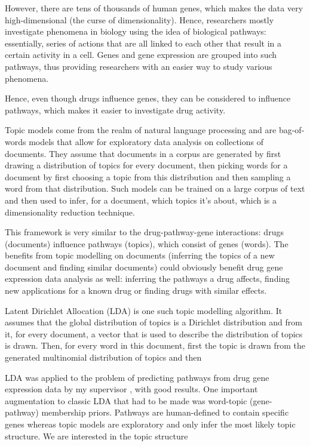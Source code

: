 \documentclass[12pt,a4paper,twoside,openright]{report}
\begin{document}
However, there are tens of thousands of human genes, which makes the data very high-dimensional (the curse of dimensionality). Hence, researchers mostly investigate phenomena in biology using the idea of biological pathways: essentially, series of actions that are all linked to each other that result in a certain activity in a cell. Genes and gene expression are grouped into such pathways, thus providing researchers with an easier way to study various phenomena.

Hence, even though drugs influence genes, they can be considered to influence pathways, which makes it easier to investigate drug activity.

Topic models come from the realm of natural language processing and are bag-of-words models that allow for exploratory data analysis on collections of documents. They assume that documents in a corpus are generated by first drawing a distribution of topics for every document, then picking words for a document by first choosing a topic from this distribution and then sampling a word from that distribution. Such models can be trained on a large corpus of text and then used to infer, for a document, which topics it's about, which is a dimensionality reduction technique.

This framework is very similar to the drug-pathway-gene interactions: drugs (documents) influence pathways (topics), which consist of genes (words). The benefits from topic modelling on documents (inferring the topics of a new document and finding similar documents) could obviously benefit drug gene expression data analysis as well: inferring the pathways a drug affects, finding new applications for a known drug or finding drugs with similar effects.

Latent Dirichlet Allocation (LDA) \cite{Blei} is one such topic modelling algorithm. It assumes that the global distribution of topics is a Dirichlet distribution and from it, for every document, a vector that is used to describe the distribution of topics is drawn. Then, for every word in this document, first the topic is drawn from the generated multinomial distribution of topics and then 

LDA was applied to the problem of predicting pathways from drug gene expression data by my supervisor \cite{Pratanwanich2014}, with good results. One important augmentation to classic LDA that had to be made was word-topic (gene-pathway) membership priors. Pathways are human-defined to contain specific genes whereas topic models are exploratory and only infer the most likely topic structure. We are interested in the topic structure
\end{document}
